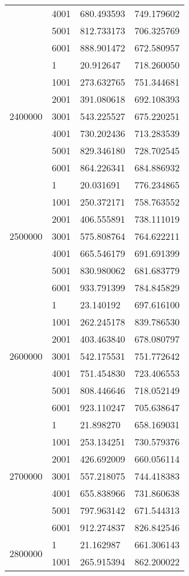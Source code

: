 \begin{table}[htb!]
\begin{tabular}{llll}
 & 4001 & 680.493593 & 749.179602 \\
 & 5001 & 812.733173 & 706.325769 \\
 & 6001 & 888.901472 & 672.580957 \\
\multirow[c]{7}{*}{2400000} & 1 & 20.912647 & 718.260050 \\
 & 1001 & 273.632765 & 751.344681 \\
 & 2001 & 391.080618 & 692.108393 \\
 & 3001 & 543.225527 & 675.220251 \\
 & 4001 & 730.202436 & 713.283539 \\
 & 5001 & 829.346180 & 728.702545 \\
 & 6001 & 864.226341 & 684.886932 \\
\multirow[c]{7}{*}{2500000} & 1 & 20.031691 & 776.234865 \\
 & 1001 & 250.372171 & 758.763552 \\
 & 2001 & 406.555891 & 738.111019 \\
 & 3001 & 575.808764 & 764.622211 \\
 & 4001 & 665.546179 & 691.691399 \\
 & 5001 & 830.980062 & 681.683779 \\
 & 6001 & 933.791399 & 784.845829 \\
\multirow[c]{7}{*}{2600000} & 1 & 23.140192 & 697.616100 \\
 & 1001 & 262.245178 & 839.786530 \\
 & 2001 & 403.463840 & 678.080797 \\
 & 3001 & 542.175531 & 751.772642 \\
 & 4001 & 751.454830 & 723.406553 \\
 & 5001 & 808.446646 & 718.052149 \\
 & 6001 & 923.110247 & 705.638647 \\
\multirow[c]{7}{*}{2700000} & 1 & 21.898270 & 658.169031 \\
 & 1001 & 253.134251 & 730.579376 \\
 & 2001 & 426.692009 & 660.056114 \\
 & 3001 & 557.218075 & 744.418383 \\
 & 4001 & 655.838966 & 731.860638 \\
 & 5001 & 797.963142 & 671.544313 \\
 & 6001 & 912.274837 & 826.842546 \\
\multirow[c]{7}{*}{2800000} & 1 & 21.162987 & 661.306143 \\
 & 1001 & 265.915394 & 862.200022 \\

\end{tabular}
\end{table}
